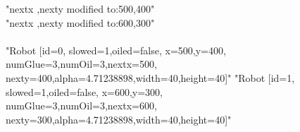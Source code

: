 \begin{itemize}
		"nextx ,nexty modified to:500,400"\\
		"nextx ,nexty modified to:600,300"\\
	\\
		"Robot [id=0,  slowed=1,oiled=false, x=500,y=400, 
		\\numGlue=3,numOil=3,nextx=500,
		\\nexty=400,alpha=4.71238898,width=40,height=40]"\newline
		"Robot [id=1,  slowed=1,oiled=false, x=600,y=300, 
		\\numGlue=3,numOil=3,nextx=600,
		\\nexty=300,alpha=4.71238898,width=40,height=40]"\newline
\end{itemize}

